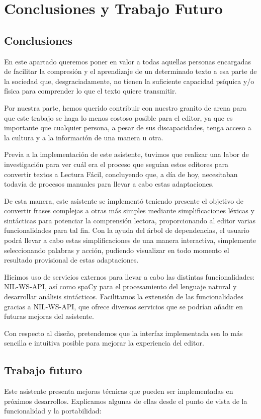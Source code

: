 \chapter{Conclusiones y Trabajo Futuro}
\label{cap:conclusiones}

\section{Conclusiones}
En este apartado queremos poner en valor a todas aquellas personas encargadas de facilitar la compresión y el aprendizaje de un determinado texto a esa parte de la sociedad que, desgraciadamente, no tienen la suficiente capacidad psíquica y/o física para comprender lo que el texto quiere transmitir.

Por nuestra parte, hemos querido contribuir con nuestro granito de arena para que este trabajo se haga lo menos costoso posible para el editor, ya que es importante que cualquier persona, a pesar de sus discapacidades, tenga acceso a la cultura y a la información de una manera u otra.

Previa a la implementación de este asistente, tuvimos que realizar una labor de investigación para ver cuál era el proceso que seguían estos editores para convertir textos a Lectura Fácil, concluyendo que, a día de hoy, necesitaban todavía de procesos manuales para llevar a cabo estas adaptaciones.

De esta manera, este asistente se implementó teniendo presente el objetivo de convertir frases complejas a otras más simples mediante simplificaciones léxicas y sintácticas para potenciar la comprensión lectora, proporcionando al editor varias funcionalidades para tal fin. Con la ayuda del árbol de dependencias, el usuario podrá llevar a cabo estas simplificaciones de una manera interactiva, simplemente seleccionando palabras y acción, pudiendo visualizar en todo momento el resultado provisional de estas adaptaciones.

Hicimos uso de servicios externos para llevar a cabo las distintas funcionalidades: NIL-WS-API, así como spaCy para el procesamiento del lenguaje natural y desarrollar análisis sintácticos. Facilitamos la extensión de las funcionalidades gracias a NIL-WS-API, que ofrece diversos servicios que se podrían añadir en futuras mejoras del asistente.

Con respecto al diseño, pretendemos que la interfaz implementada sea lo más sencilla e intuitiva posible para mejorar la experiencia del editor.

\section{Trabajo futuro}
Este asistente presenta mejoras técnicas que pueden ser implementadas en próximos desarrollos. Explicamos algunas de ellas desde el punto de vista de la funcionalidad y la portabilidad:

